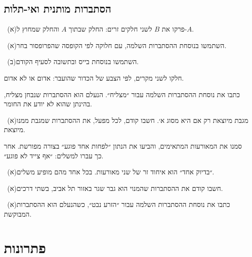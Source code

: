 \documentclass[12pt, a4paper]{article}
\begin{document}
\subsection*{הסתברות מותנית ואי-תלות}
\noindent {}\ (א)\enskip פרקו את $B$ לשני חלקים זרים: החלק שבתוך $A$ והחלק שמחוץ ל-$A$.\par\smallskip
\noindent {}\ (א)\enskip השתמשו בנוסחת ההסתברות השלמה, עם חלוקה לפי הקופסה שהפרופסור בחר.\par\smallskip
\noindent {}\ (ב)\enskip השתמשו בנוסחת בייס ובתשובה לסעיף הקודם.\par\smallskip
\noindent {}\enskip חלקו לשני מקרים, לפי הצבע של הכדור שהועבר: אדום או לא אדום.\par\smallskip
\noindent {}\enskip כתבו את נוסחת ההסתברות השלמה עבור ״מצליח״. הנעלם הוא ההסתברות שנבחן מצליח, בהינתן שהוא לא יודע את החומר.\par\smallskip
\noindent {}\ (א)\enskip מגבת מיוצאת רק אם היא מסוג א׳. חשבו קודם, לכל מפעל, את ההסתברות שמגבת ממנו מיוצאת.\par\smallskip
\noindent {}\enskip סמנו את המאורעות המתאימים, והביעו את הנתון ״לפחות אחד פוגע״ בצורה מפורשת. אחר כך עברו למשלים: ״אף צייד לא פוגע״.\par\smallskip
\noindent {}\ (א)\enskip ״בדיוק אחד״ הוא איחוד זר של שני מאורעות. בכל אחד מהם מופיע משלים.\par\smallskip
\noindent {}\ (א)\enskip חשבו קודם את ההסתברות שהמנוי הוא גבר שגר באזור תל אביב, בשתי דרכים.\par\smallskip
\noindent {}\ (א)\enskip כתבו את נוסחת ההסתברות השלמה עבור ״הזרע נבט״, כשהנעלם הוא ההסתברות המבוקשת.\par\smallskip

\newpage
\section*{פתרונות}
\renewcommand{\hint}[1]{}   %
\setcounter{section}{0}


\end{document}

